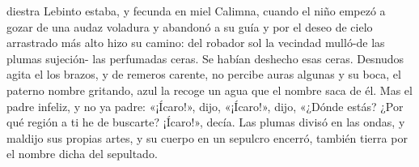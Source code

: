 diestra Lebinto estaba, y fecunda en miel Calimna,
cuando el niño empezó a gozar de una audaz voladura
y abandonó a su guía y por el deseo de cielo arrastrado
más alto hizo su camino: del robador sol la vecindad
mulló-de las plumas sujeción- las perfumadas ceras.
Se habían deshecho esas ceras. Desnudos agita el los brazos,
y de remeros carente, no percibe auras algunas
y su boca, el paterno nombre gritando, azul
la recoge un agua que el nombre saca de él.
Mas el padre infeliz, y no ya padre: «¡Ícaro!», dijo,
«¡Ícaro!», dijo, «¿Dónde estás? ¿Por qué región a ti he de buscarte?
¡Ícaro!», decía. Las plumas divisó en las ondas,
y maldijo sus propias artes, y su cuerpo en un sepulcro
encerró, también tierra por el nombre dicha del sepultado.
